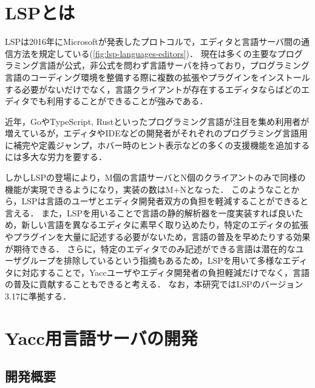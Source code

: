 \documentclass[fontsize=9bp,twocolumn,column_gap=2.36zw,a4paper,report]{jlreq}
\begin{document}
\chapter{LSPとは}

LSPは2016年にMicrosoftが発表したプロトコルで，エディタと言語サーバ間の通信方法を規定している(\ref{fig:lsp-languages-editors})．
現在は多くの主要なプログラミング言語が公式，非公式を問わず言語サーバを持っており\cite{lsp_impl}，プログラミング言語のコーディング環境を整備する際に複数の拡張やプラグインをインストールする必要がないだけでなく，言語クライアントが存在するエディタならばどのエディタでも利用することができることが強みである．\par
近年，GoやTypeScript, Rustといったプログラミング言語が注目を集め利用者が増えているが，エディタやIDEなどの開発者がそれぞれのプログラミング言語用に補完や定義ジャンプ，ホバー時のヒント表示などの多くの支援機能を追加するには多大な労力を要する．
\begin{figure}[h]
\end{figure}

しかしLSPの登場により，M個の言語サーバとN個のクライアントのみで同様の機能が実現できるようになり，実装の数はM+Nとなった．
このようなことから，LSPは言語のユーザとエディタ開発者双方の負担を軽減することができると言える．
また，LSPを用いることで言語の静的解析器を一度実装すれば良いため，新しい言語を異なるエディタに素早く取り込めたり，特定のエディタの拡張やプラグインを大量に記述する必要がないため，言語の普及を早めたりする効果が期待できる．
さらに，特定のエディタでのみ記述ができる言語は潜在的なユーザグループを排除しているという指摘\cite{decoupling}もあるため，LSPを用いて多様なエディタに対応することで，Yaccユーザやエディタ開発者の負担軽減だけでなく，言語の普及に貢献することもできると考える．
なお，本研究ではLSPのバージョン3.17に準拠する．
\newline

\chapter{Yacc用言語サーバの開発}
\section{開発概要}
\end{document}
